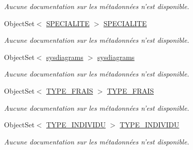 \begin{DoxyCompactItemize}
\begin{DoxyCompactList}\small\item\em Aucune documentation sur les métadonnées n'est disponible. \end{DoxyCompactList}\item 
Object\-Set$<$ \hyperlink{class_model_1_1_s_p_e_c_i_a_l_i_t_e}{S\-P\-E\-C\-I\-A\-L\-I\-T\-E} $>$ \hyperlink{class_model_1_1_b_d_d___s_i_o7_entities_ac2e52a3850fb20c481adac53dd529ab0}{S\-P\-E\-C\-I\-A\-L\-I\-T\-E}
\begin{DoxyCompactList}\small\item\em Aucune documentation sur les métadonnées n'est disponible. \end{DoxyCompactList}\item 
Object\-Set$<$ \hyperlink{class_model_1_1sysdiagrams}{sysdiagrams} $>$ \hyperlink{class_model_1_1_b_d_d___s_i_o7_entities_a58f4c74a27a387297972be29496fd65b}{sysdiagrams}
\begin{DoxyCompactList}\small\item\em Aucune documentation sur les métadonnées n'est disponible. \end{DoxyCompactList}\item 
Object\-Set$<$ \hyperlink{class_model_1_1_t_y_p_e___f_r_a_i_s}{T\-Y\-P\-E\-\_\-\-F\-R\-A\-I\-S} $>$ \hyperlink{class_model_1_1_b_d_d___s_i_o7_entities_a9a8272432096c86002858504785d663d}{T\-Y\-P\-E\-\_\-\-F\-R\-A\-I\-S}
\begin{DoxyCompactList}\small\item\em Aucune documentation sur les métadonnées n'est disponible. \end{DoxyCompactList}\item 
Object\-Set$<$ \hyperlink{class_model_1_1_t_y_p_e___i_n_d_i_v_i_d_u}{T\-Y\-P\-E\-\_\-\-I\-N\-D\-I\-V\-I\-D\-U} $>$ \hyperlink{class_model_1_1_b_d_d___s_i_o7_entities_a1b24dfc017d342ad01ac90045173c72c}{T\-Y\-P\-E\-\_\-\-I\-N\-D\-I\-V\-I\-D\-U}
\begin{DoxyCompactList}\small\item\em Aucune documentation sur les métadonnées n'est disponible. \end{DoxyCompactList}\item 

\end{DoxyCompactItemize}
